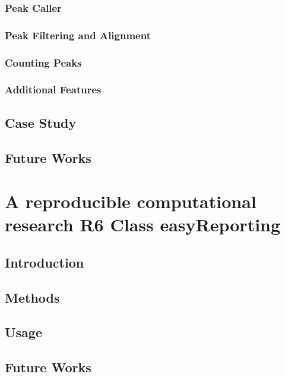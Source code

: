 \documentclass[b5paper,oneside,british,intoc,bibliograph=totoc,index=totoc,BCOR10mm,twoside,openright]{book}
\numberwithin{equation}{section}
\numberwithin{figure}{section}
\begin{document}
\subsection{Peak Caller} \label{sec:descan2peakcall}

\subsection{Peak Filtering and Alignment} \label{sec:descan2filtering}

\subsection{Counting Peaks} \label{sec:descan2peakcounts}

\subsection{Additional Features} \label{sec:descan2addfeat}

\section{Case Study} \label{sec:descan2results}

\section{Future Works} \label{sec:descan2next}



\chapter{A reproducible computational research R6 Class \newline easyReporting}

\section{Introduction} 

\section{Methods}

\section{Usage}

\section{Future Works}

\end{document}

